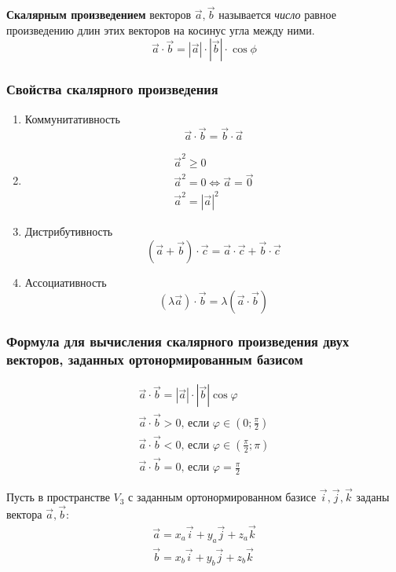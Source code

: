 \begin{definition}
  \textbf{Скалярным произведением} векторов $\vec{a}, \vec{b}$ называется \textit{число}  равное произведению длин этих векторов на косинус угла между ними.\[
  \vec{a} \cdot \vec{b} = |\vec{a}| \cdot |\vec{b}| \cdot \cos \phi
  \] 
\end{definition}

\subsubsection{Свойства скалярного произведения}

\begin{enumerate}
  \item Коммунитативность \[
    \vec{a} \cdot \vec{b} = \vec{b} \cdot \vec{a}
  \] 
\item
  \begin{gather*}
    \vec{a}^2 \ge 0 \\
    \vec{a}^2 = 0 \iff \vec{a} = \vec{0} \\
    \vec{a}^2 = |\vec{a}|^2
  \end{gather*}
  \item Дистрибутивность \[
      \left( \vec{a} + \vec{b} \right) \cdot \vec{c} = \vec{a} \cdot \vec{c} + \vec{b} \cdot \vec{c}
  \]
  \item Ассоциативность \[
    \left( \lambda \vec{a} \right) \cdot \vec{b} = \lambda \left( \vec{a} \cdot \vec{b} \right) 
  \]
\end{enumerate}

\subsubsection{Формула для вычисления скалярного произведения двух векторов, заданных ортонормированным базисом}

\begin{gather*}
  \vec{a} \cdot \vec{b} = |\vec{a}| \cdot |\vec{b}| \cos \varphi \\
  \vec{a} \cdot \vec{b} > 0 \text{, если } \varphi \in \left( 0; \frac{\pi}{2} \right)  \\
  \vec{a} \cdot \vec{b} < 0 \text{, если } \varphi \in \left( \frac{\pi}{2}; \pi \right) \\
  \vec{a} \cdot \vec{b} = 0 \text{, если } \varphi = \frac{\pi}{2}
\end{gather*}

Пусть в пространстве $V_3$ с заданным ортонормированном базисе $\vec{i}, \vec{j}, \vec{k}$ заданы вектора $\vec{a}, \vec{b}$:
\begin{gather*}
  \vec{a} = x_a \vec{i} + y_a \vec{j} + z_a \vec{k} \\
  \vec{b} = x_b \vec{i} + y_b \vec{j} + z_b \vec{k} \\
\end{gather*}

